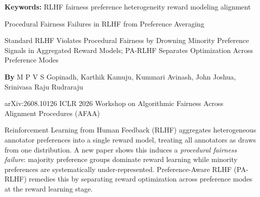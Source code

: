 \documentclass[10pt,twocolumn]{article}
\begin{document}
\setlength{\parindent}{0pt}
\setlength{\parskip}{4pt}

{\small\color{keywordgray}\textbf{Keywords:}
  RLHF fairness \textbullet{}
  preference heterogeneity \textbullet{}
  reward modeling \textbullet{}
  alignment}\par\vspace{4pt}

{\LARGE\bfseries\raggedright
  Procedural Fairness Failures in RLHF
  from Preference Averaging}\par\vspace{4pt}

{\large\itshape\raggedright
  Standard RLHF Violates Procedural Fairness by Drowning Minority Preference Signals
  in Aggregated Reward Models; PA-RLHF Separates Optimization Across Preference Modes}\par\vspace{6pt}

{\small\textbf{By} M P V S Gopinadh, Karthik Kamuju, Kummari Avinash,
  John Joshua, Srinivasa Raju Rudraraju}\par\vspace{2pt}

{\small\color{keywordgray}arXiv:2608.10126 \textbullet{}
  ICLR 2026 Workshop on Algorithmic Fairness Across Alignment Procedures (AFAA)}
\par\vspace{2pt}\noindent{\color{rulered}\rule{\columnwidth}{0.6pt}}\vspace{6pt}

Reinforcement Learning from Human Feedback (RLHF) aggregates heterogeneous annotator
preferences into a single reward model, treating all annotators as draws from one
distribution. A new paper shows this induces a \emph{procedural fairness failure}:
majority preference groups dominate reward learning while minority preferences are
systematically under-represented. Preference-Aware RLHF (PA-RLHF) remedies this by
separating reward optimization across preference modes at the reward learning stage.
\end{document}
